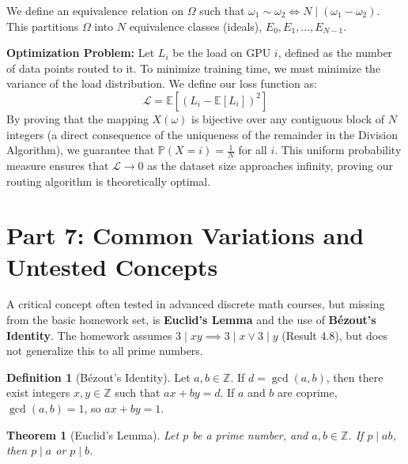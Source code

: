 \documentclass[11pt]{article}
\newtheorem{theorem}{Theorem}[section]
\theoremstyle{definition}
\newtheorem{definition}{Definition}[section]
\theoremstyle{remark}
\newcommand{\Z}{\mathbb{Z}}
\newcommand{\Prob}{\mathbb{P}}
\newcommand{\E}{\mathbb{E}}
\begin{document}
We define an equivalence relation on $\Omega$ such that $\omega_1 \sim \omega_2 \iff N \mid (\omega_1 - \omega_2)$. This partitions $\Omega$ into $N$ equivalence classes (ideals), $E_0, E_1, \dots, E_{N-1}$.

\textbf{Optimization Problem:}
Let $L_i$ be the load on GPU $i$, defined as the number of data points routed to it. To minimize training time, we must minimize the variance of the load distribution. We define our loss function as:
\[ \mathcal{L} = \E\left[ (L_i - \E[L_i])^2 \right] \]
By proving that the mapping $X(\omega)$ is bijective over any contiguous block of $N$ integers (a direct consequence of the uniqueness of the remainder in the Division Algorithm), we guarantee that $\Prob(X = i) = \frac{1}{N}$ for all $i$. This uniform probability measure ensures that $\mathcal{L} \to 0$ as the dataset size approaches infinity, proving our routing algorithm is theoretically optimal.

\newpage
\section{Part 7: Common Variations and Untested Concepts}

A critical concept often tested in advanced discrete math courses, but missing from the basic homework set, is \textbf{Euclid's Lemma} and the use of \textbf{Bézout's Identity}. The homework assumes $3 \mid xy \implies 3 \mid x \lor 3 \mid y$ (Result 4.8), but does not generalize this to all prime numbers.

\begin{definition}[Bézout's Identity]
Let $a, b \in \Z$. If $d = \gcd(a,b)$, then there exist integers $x, y \in \Z$ such that $ax + by = d$. If $a$ and $b$ are coprime, $\gcd(a,b) = 1$, so $ax + by = 1$.
\end{definition}

\begin{theorem}[Euclid's Lemma]
Let $p$ be a prime number, and $a, b \in \Z$. If $p \mid ab$, then $p \mid a$ or $p \mid b$.
\end{theorem}
\end{document}
